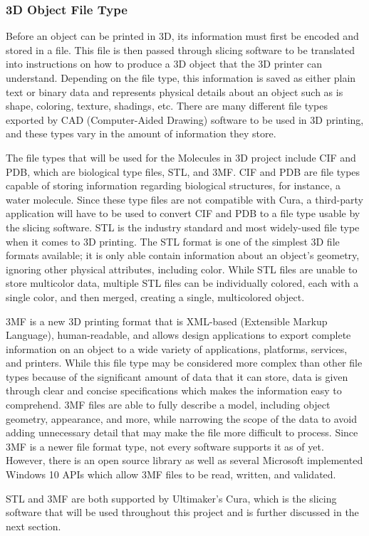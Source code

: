 \documentclass[letterpaper, onecolumn, draftclsnofoot, 10pt, compsoc]{IEEEtran}
\begin{document}
\begin{singlespace}
        \subsubsection{3D Object File Type}
	Before an object can be printed in 3D, its information must first be encoded and stored in a file. 
    This file is then passed through slicing software to be translated into instructions on how to produce a 3D object that the 3D printer can understand. 
	Depending on the file type, this information is saved as either plain text or binary data and represents physical details about an object such as is shape, coloring, texture, shadings, etc. \cite{all3dpweb}
	There are many different file types exported by CAD (Computer-Aided Drawing) software to be used in 3D printing, and these types vary in the amount of information they store. \par
	The file types that will be used for the Molecules in 3D project include CIF and PDB, which are biological type files, STL, and 3MF.
        CIF and PDB are file types capable of storing information regarding biological structures, for instance, a water molecule. 
        Since these type files are not compatible with Cura, a third-party application will have to be used to convert CIF and PDB to a file type usable by the slicing software.
        STL is the industry standard and most widely-used file type when it comes to 3D printing.
        The STL format is one of the simplest 3D file formats available; it is only able contain information about an object's geometry, ignoring other physical attributes, including color.\cite{3dbeginweb}
	While STL files are unable to store multicolor data, multiple STL files can be individually colored, each with a single color, and then merged, creating a single, multicolored object.\par
	3MF is a new 3D printing format that is XML-based (Extensible Markup Language), human-readable, and allows design applications to export complete information on an object to a wide variety of applications, platforms, services, and printers. \cite{3mfweb}
	While this file type may be considered more complex than other file types because of the significant amount of data that it can store, data is given through clear and concise specifications which makes the information easy to comprehend.
	3MF files are able to fully describe a model, including object geometry, appearance, and more, while narrowing the scope of the data to avoid adding unnecessary detail that may make the file more difficult to process. 
	Since 3MF is a newer file format type, not every software supports it as of yet.
	However, there is an open source library as well as several Microsoft implemented Windows 10 APIs which allow 3MF files to be read, written, and validated. \par
    STL and 3MF are both supported by Ultimaker's Cura, which is the slicing software that will be used throughout this project and is further discussed in the next section.
    

\end{singlespace}
\end{document}
